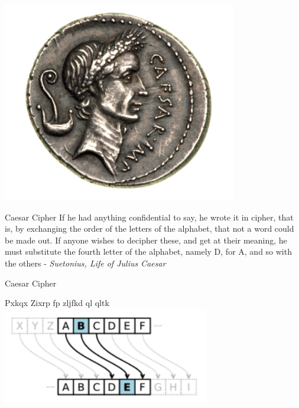 \documentclass{beamer}
\begin{document}
\begin{frame}{}
\begin{center}
\includegraphics[width=0.7\linewidth]{coin.png}
\end{center}
\end{frame}

\begin{frame}{Caesar Cipher}
If he had anything confidential to say, he wrote it in cipher, that is, by exchanging the order of the letters of the alphabet, that not a word could be made out.  If anyone wishes to decipher these, and get at their meaning, he must substitute the fourth letter of the alphabet, namely D, for A, and so with the others - \textit{Suetonius, Life of Julius Caesar}
\end{frame}

\begin{frame}{Caesar Cipher}
\begin{center}
Pxkqx Zixrp fp zljfkd ql qltk \newline
\includegraphics[width=0.7\linewidth]{caesar-cipher.png}\newline
\end{center}
\end{frame}
\end{document}
